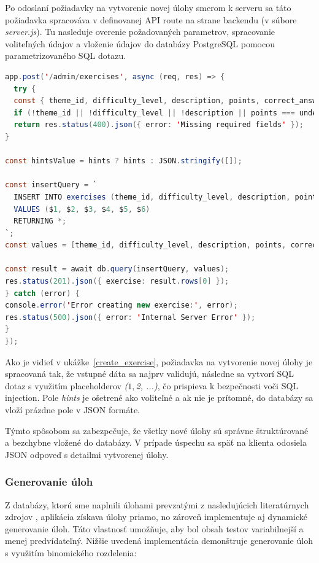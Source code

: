 Po odoslaní požiadavky na vytvorenie novej úlohy smerom k serveru sa táto požiadavka spracováva v definovanej API route na strane backendu (v súbore \textit{server.js}). 
Tu nasleduje overenie požadovaných parametrov, spracovanie voliteľných údajov a vloženie údajov do databázy PostgreSQL pomocou parametrizovaného SQL dotazu.
\begin{lstlisting}[caption={Serverová logika na spracovanie POST požiadavky pre vytvorenie úlohy}, label={create_exercise}, language=java, style=code-listing]
  app.post('/admin/exercises', async (req, res) => {
  try {
  const { theme_id, difficulty_level, description, points, correct_answer, hints } = req.body;
  if (!theme_id || !difficulty_level || !description || points === undefined || !correct_answer) {
  return res.status(400).json({ error: 'Missing required fields' });
}

const hintsValue = hints ? hints : JSON.stringify([]);

const insertQuery = `
  INSERT INTO exercises (theme_id, difficulty_level, description, points, correct_answer, hints)
  VALUES ($1, $2, $3, $4, $5, $6)
  RETURNING *;
`;
const values = [theme_id, difficulty_level, description, points, correct_answer, hintsValue];

const result = await db.query(insertQuery, values);
res.status(201).json({ exercise: result.rows[0] });
} catch (error) {
console.error('Error creating new exercise:', error);
res.status(500).json({ error: 'Internal Server Error' });
}
});
\end{lstlisting}

Ako je vidieť v ukážke~\ref{create_exercise}, požiadavka na vytvorenie novej úlohy je spracovaná tak, že vstupné dáta sa najprv validujú, následne sa vytvorí SQL dotaz s využitím placeholderov \textit{($1, $2, ...)}, čo prispieva k bezpečnosti voči SQL injection.
 Pole \textit{hints} je ošetrené ako voliteľné a ak nie je prítomné, do databázy sa vloží prázdne pole v JSON formáte.

Týmto spôsobom sa zabezpečuje, že všetky nové úlohy sú správne štruktúrované a bezchybne vložené do databázy. 
V prípade úspechu sa späť na klienta odosiela JSON odpoveď s detailmi vytvorenej úlohy.


\subsubsection{Generovanie úloh}
Z databázy, ktorú sme naplnili úlohami prevzatými z nasledujúcich literatúrnych zdrojov \cite{nanasiova} \cite{volauf}, aplikácia získava úlohy priamo, no zároveň implementuje aj dynamické generovanie úloh. Táto vlastnosť umožňuje, aby bol obsah testov variabilnejší a menej predvídateľný. Nižšie uvedená implementácia demonštruje generovanie úloh s využitím binomického rozdelenia:


